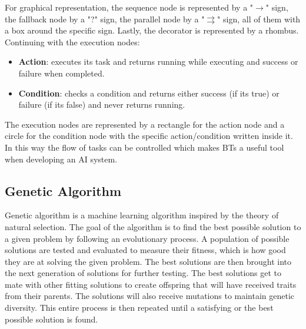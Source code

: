 For graphical representation, the sequence node is represented by a "$\rightarrow$" sign, the fallback node by a "?" sign, the parallel node by a "$\rightrightarrows$" sign, all of them with a box around the specific sign. Lastly, the decorator is represented by a rhombus.
Continuing with the execution nodes:
\begin{itemize}
    \item \textbf{Action}: executes its task and returns running while executing and success or failure when completed.
    \item \textbf{Condition}: checks a condition and returns either success (if its true) or failure (if its false) and never returns running. 
\end{itemize} 
The execution nodes are represented by a rectangle for the action node and a circle for the condition node with the specific action/condition written inside it.
In this way the flow of tasks can be controlled which makes BTs a useful tool when developing an AI system\cite{BTsinAI}. 

\subsection{Genetic Algorithm}
Genetic algorithm is a machine learning algorithm inspired by the theory of natural selection. The goal of the algorithm is to find the best possible solution to a given problem by following an evolutionary process. A population of possible solutions are tested and evaluated to measure their fitness, which is how good they are at solving the given problem. The best solutions are then brought into the next generation of solutions for further testing. The best solutions get to mate with other fitting solutions to create offspring that will have received traits from their parents. The solutions will also receive mutations to maintain genetic diversity. This entire process is then repeated until a satisfying or the best possible solution is found\cite{BiscontiniGA}.

